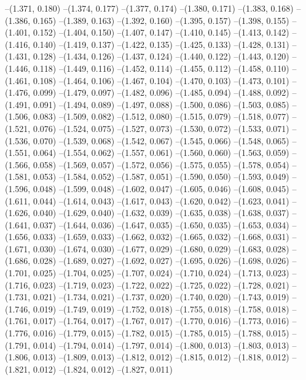 {--(1.371, 0.180)
--(1.374, 0.177)
--(1.377, 0.174)
--(1.380, 0.171)
--(1.383, 0.168)
--(1.386, 0.165)
--(1.389, 0.163)
--(1.392, 0.160)
--(1.395, 0.157)
--(1.398, 0.155)
--(1.401, 0.152)
--(1.404, 0.150)
--(1.407, 0.147)
--(1.410, 0.145)
--(1.413, 0.142)
--(1.416, 0.140)
--(1.419, 0.137)
--(1.422, 0.135)
--(1.425, 0.133)
--(1.428, 0.131)
--(1.431, 0.128)
--(1.434, 0.126)
--(1.437, 0.124)
--(1.440, 0.122)
--(1.443, 0.120)
--(1.446, 0.118)
--(1.449, 0.116)
--(1.452, 0.114)
--(1.455, 0.112)
--(1.458, 0.110)
--(1.461, 0.108)
--(1.464, 0.106)
--(1.467, 0.104)
--(1.470, 0.103)
--(1.473, 0.101)
--(1.476, 0.099)
--(1.479, 0.097)
--(1.482, 0.096)
--(1.485, 0.094)
--(1.488, 0.092)
--(1.491, 0.091)
--(1.494, 0.089)
--(1.497, 0.088)
--(1.500, 0.086)
--(1.503, 0.085)
--(1.506, 0.083)
--(1.509, 0.082)
--(1.512, 0.080)
--(1.515, 0.079)
--(1.518, 0.077)
--(1.521, 0.076)
--(1.524, 0.075)
--(1.527, 0.073)
--(1.530, 0.072)
--(1.533, 0.071)
--(1.536, 0.070)
--(1.539, 0.068)
--(1.542, 0.067)
--(1.545, 0.066)
--(1.548, 0.065)
--(1.551, 0.064)
--(1.554, 0.062)
--(1.557, 0.061)
--(1.560, 0.060)
--(1.563, 0.059)
--(1.566, 0.058)
--(1.569, 0.057)
--(1.572, 0.056)
--(1.575, 0.055)
--(1.578, 0.054)
--(1.581, 0.053)
--(1.584, 0.052)
--(1.587, 0.051)
--(1.590, 0.050)
--(1.593, 0.049)
--(1.596, 0.048)
--(1.599, 0.048)
--(1.602, 0.047)
--(1.605, 0.046)
--(1.608, 0.045)
--(1.611, 0.044)
--(1.614, 0.043)
--(1.617, 0.043)
--(1.620, 0.042)
--(1.623, 0.041)
--(1.626, 0.040)
--(1.629, 0.040)
--(1.632, 0.039)
--(1.635, 0.038)
--(1.638, 0.037)
--(1.641, 0.037)
--(1.644, 0.036)
--(1.647, 0.035)
--(1.650, 0.035)
--(1.653, 0.034)
--(1.656, 0.033)
--(1.659, 0.033)
--(1.662, 0.032)
--(1.665, 0.032)
--(1.668, 0.031)
--(1.671, 0.030)
--(1.674, 0.030)
--(1.677, 0.029)
--(1.680, 0.029)
--(1.683, 0.028)
--(1.686, 0.028)
--(1.689, 0.027)
--(1.692, 0.027)
--(1.695, 0.026)
--(1.698, 0.026)
--(1.701, 0.025)
--(1.704, 0.025)
--(1.707, 0.024)
--(1.710, 0.024)
--(1.713, 0.023)
--(1.716, 0.023)
--(1.719, 0.023)
--(1.722, 0.022)
--(1.725, 0.022)
--(1.728, 0.021)
--(1.731, 0.021)
--(1.734, 0.021)
--(1.737, 0.020)
--(1.740, 0.020)
--(1.743, 0.019)
--(1.746, 0.019)
--(1.749, 0.019)
--(1.752, 0.018)
--(1.755, 0.018)
--(1.758, 0.018)
--(1.761, 0.017)
--(1.764, 0.017)
--(1.767, 0.017)
--(1.770, 0.016)
--(1.773, 0.016)
--(1.776, 0.016)
--(1.779, 0.015)
--(1.782, 0.015)
--(1.785, 0.015)
--(1.788, 0.015)
--(1.791, 0.014)
--(1.794, 0.014)
--(1.797, 0.014)
--(1.800, 0.013)
--(1.803, 0.013)
--(1.806, 0.013)
--(1.809, 0.013)
--(1.812, 0.012)
--(1.815, 0.012)
--(1.818, 0.012)
--(1.821, 0.012)
--(1.824, 0.012)
--(1.827, 0.011)
}
